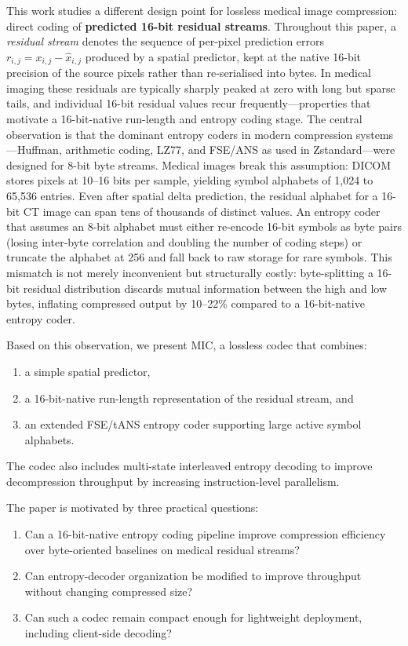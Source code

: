 \documentclass[journal]{IEEEtran}
\begin{document}
This work studies a different design point for lossless medical image
compression: direct coding of \textbf{predicted 16-bit residual streams}.
Throughout this paper, a \emph{residual stream} denotes the sequence of
per-pixel prediction errors $r_{i,j} = x_{i,j} - \hat{x}_{i,j}$ produced by a
spatial predictor, kept at the native 16-bit precision of the source pixels
rather than re-serialised into bytes. In medical imaging these residuals are
typically sharply peaked at zero with long but sparse tails, and individual
16-bit residual values recur frequently---properties that motivate a
16-bit-native run-length and entropy coding stage. The
central observation is that the dominant entropy coders in modern compression
systems---Huffman, arithmetic coding, LZ77, and FSE/ANS as used in
Zstandard---were designed for 8-bit byte streams. Medical images break this
assumption: DICOM stores pixels at 10--16 bits per sample, yielding symbol
alphabets of 1,024 to 65,536 entries. Even after spatial delta prediction, the
residual alphabet for a 16-bit CT image can span tens of thousands of distinct
values. An entropy coder that assumes an 8-bit alphabet must either re-encode
16-bit symbols as byte pairs (losing inter-byte correlation and doubling the
number of coding steps) or truncate the alphabet at 256 and fall back to raw
storage for rare symbols. This mismatch is not merely inconvenient but
structurally costly: byte-splitting a 16-bit residual distribution discards
mutual information between the high and low bytes, inflating compressed output
by 10--22\% compared to a 16-bit-native entropy coder.

Based on this observation, we present MIC, a lossless codec that combines:
\begin{enumerate}
  \item a simple spatial predictor,
  \item a 16-bit-native run-length representation of the residual stream, and
  \item an extended FSE/tANS entropy coder supporting large active symbol
  alphabets.
\end{enumerate}

The codec also includes multi-state interleaved entropy decoding to improve
decompression throughput by increasing instruction-level parallelism.

The paper is motivated by three practical questions:
\begin{enumerate}
  \item Can a 16-bit-native entropy coding pipeline improve compression
  efficiency over byte-oriented baselines on medical residual streams?
  \item Can entropy-decoder organization be modified to improve throughput
  without changing compressed size?
  \item Can such a codec remain compact enough for lightweight deployment,
  including client-side decoding?
\end{enumerate}
\end{document}
